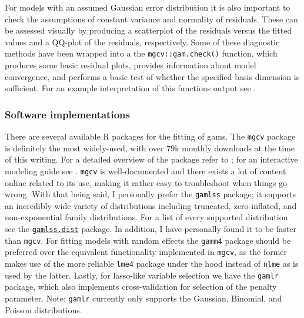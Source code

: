 \documentclass{report}
\begin{document}
For models with an assumed Gaussian error distribution it is also important to check the assumptions of constant variance and normality of residuals. These can be assessed visually by producing a scatterplot of the residuals versus the fitted values and a QQ-plot of the residuals, respectively. Some of these diagnostic methods have been wrapped into a the \texttt{mgcv::gam.check()} function, which produces some basic residual plots, provides information about model convergence, and performs a basic test of whether the specified basis dimension is sufficient. For an example interpretation of this functions output see \cite[Chapter~7.2.1]{wood_generalized_2017}. 

\subsubsection{Software implementations}

There are several available R packages for the fitting of \glspl{gam}. The \texttt{mgcv} package is definitely the most widely-used, with over 79k monthly downloads at the time of this writing. For a detailed overview of the package refer to \cite[Chapter~7]{wood_generalized_2017}; for an interactive modeling guide see \cite{ross_generalized_2019}. \texttt{mgcv} is well-documented and there exists a lot of content online related to its use, making it rather easy to troubleshoot when things go wrong. With that being said, I personally prefer the \texttt{gamlss} package; it supports an incredibly wide variety of distributions including truncated, zero-inflated, and non-exponential family distributions. For a list of every supported distribution see the \href{https://cran.r-project.org/web/packages/gamlss.dist/gamlss.dist.pdf}{\texttt{gamlss.dist}} package. In addition, I have personally found it to be faster than \texttt{mgcv}. For fitting models with random effects the \texttt{gamm4} package should be preferred over the equivalent functionality implemented in \texttt{mgcv}, as the former makes use of the more reliable \texttt{lme4} package under the hood instead of \texttt{nlme} as is used by the latter. Lastly, for \gls{lasso}-like variable selection we have the \texttt{gamlr} package, which also implements cross-validation for selection of the penalty parameter. Note: \texttt{gamlr} currently only supports the Gaussian, Binomial, and Poisson distributions. 
\end{document}
